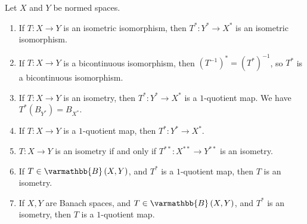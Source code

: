 \documentclass[10pt]{mypackage}
\renewcommand*{\mathbb}[1]{\varmathbb{#1}}
\newcommand{\B}{\mathbb{B}}
\begin{document}
\begin{theorem}
  Let $X$ and $Y$ be normed spaces.
  \begin{enumerate}[(1)]
    \item If $T: X\rightarrow Y$ is an isometric isomorphism, then $T^{\ast}: Y^{\ast}\rightarrow X^{\ast}$ is an isometric isomorphism.
    \item If $T: X\rightarrow Y$ is a bicontinuous isomorphism, then $\left(T^{-1}\right)^{\ast} = \left(T^{\ast}\right)^{-1}$, so $T^{\ast}$ is a bicontinuous isomorphism.
    \item If $T: X\rightarrow Y$ is an isometry, then $T^{\ast}: Y^{\ast}\rightarrow X^{\ast}$ is a $1$-quotient map. We have $T^{\ast}\left(B_{Y^{\ast}}\right) = B_{X^{\ast}}$.
    \item If $T: X\rightarrow Y$ is a $1$-quotient map, then $T^{\ast}:Y^{\ast}\rightarrow X^{\ast}$.
    \item $T: X\rightarrow Y$ is an isometry if and only if $T^{\ast\ast}: X^{\ast\ast}\rightarrow Y^{\ast\ast}$ is an isometry.
    \item If $T\in \B\left(X,Y\right)$, and $T^{\ast}$ is a $1$-quotient map, then $T$ is an isometry.
    \item If $X,Y$ are Banach spaces, and $T\in \B\left(X,Y\right)$, and $T^{\ast}$ is an isometry, then $T$ is a $1$-quotient map.
  \end{enumerate}
\end{theorem}
\end{document}
